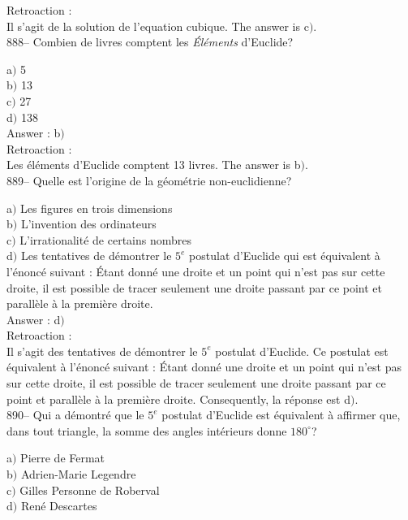 ﻿\documentclass[letterpaper, 12pt]{article}
\begin{document}
Retroaction :\\
Il s'agit de la solution de l'equation cubique. The answer is
c$)$.\\

888-- Combien de livres comptent les {\sl \'El\'ements} d'Euclide?

a$)$ 5 \\
b$)$ 13  \\
c$)$ 27 \\
d$)$ 138 \\

Answer : b$)$\\

Retroaction : \\
Les \'el\'ements d'Euclide comptent 13 livres. The answer is b$)$.\\

889-- Quelle est l'origine de la g\'eom\'etrie non-euclidienne?

a$)$ Les figures en trois dimensions \\
b$)$ L'invention des ordinateurs  \\
c$)$ L'irrationalit\'e de certains nombres \\
d$)$ Les tentatives de d\'emontrer le $5^e$ postulat d'Euclide qui
est \'equivalent \`a l'\'enonc\'e suivant : \og\'Etant donn\'e une
droite et un point qui n'est pas sur cette droite, il est possible
de tracer seulement une droite passant
par ce point et parall\`ele \`a la premi\`ere droite\fg .\\

Answer : d$)$\\

Retroaction : \\
Il s'agit des tentatives de d\'emontrer le $5^e$ postulat d'Euclide.
Ce postulat est \'equivalent \`a l'\'enonc\'e suivant : \og\'Etant
donn\'e une droite et un point qui n'est pas sur cette droite, il
est possible de tracer seulement une droite passant par ce point et
parall\`ele \`a la premi\`ere droite\fg . Consequently, la
r\'eponse est d$)$.\\

890-- Qui a d\'emontr\'e que le $5^e$ postulat d'Euclide est
\'equivalent \`a affirmer que, dans tout triangle, la somme des
angles int\'erieurs donne $180^{\circ}$?

a$)$ Pierre de Fermat \\
b$)$ Adrien-Marie Legendre   \\
c$)$ Gilles Personne de Roberval \\
d$)$ Ren\'e Descartes \\
\end{document}
